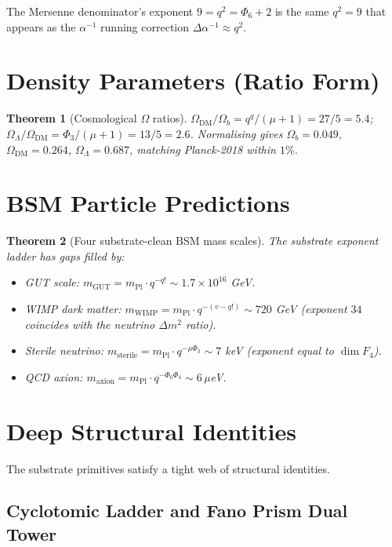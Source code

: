 \documentclass[11pt]{article}
\newtheorem{theorem}{Theorem}[section]
\newcommand{\mPl}{m_{\mathrm{Pl}}}
\begin{document}
The Mersenne denominator's exponent $9 = q^2 = \Phi_6 + 2$ is the same
$q^2 = 9$ that appears as the $\alpha^{-1}$ running correction
$\Delta\alpha^{-1} \approx q^2$.

\section{Density Parameters (Ratio Form)}

\begin{theorem}[Cosmological $\Omega$ ratios]\label{thm:omega}
$\Omega_{\mathrm{DM}}/\Omega_b = q^q/(\mu+1) = 27/5 = 5.4$;
$\Omega_\Lambda/\Omega_{\mathrm{DM}} = \Phi_3/(\mu+1) = 13/5 = 2.6$.
Normalising gives $\Omega_b = 0.049$, $\Omega_{\mathrm{DM}} = 0.264$,
$\Omega_\Lambda = 0.687$, matching Planck-2018 within $1\%$.
\end{theorem}

\section{BSM Particle Predictions}

\begin{theorem}[Four substrate-clean BSM mass scales]\label{thm:bsm}
The substrate exponent ladder has gaps filled by:
\begin{itemize}[noitemsep]
  \item GUT scale: $m_{\mathrm{GUT}} = \mPl \cdot q^{-q!} \sim 1.7 \times 10^{16}$ GeV.
  \item WIMP dark matter: $m_{\mathrm{WIMP}} = \mPl \cdot q^{-(v - q!)} \sim 720$ GeV
    (exponent $34$ coincides with the neutrino $\Delta m^2$ ratio).
  \item Sterile neutrino: $m_{\mathrm{sterile}} = \mPl \cdot q^{-\mu\Phi_3} \sim 7$ keV
    (exponent equal to $\dim F_4$).
  \item QCD axion: $m_{\mathrm{axion}} = \mPl \cdot q^{-\Phi_6\Phi_4} \sim 6\,\mu$eV.
\end{itemize}
\end{theorem}

\section{Deep Structural Identities}

The substrate primitives satisfy a tight web of structural identities.

\subsection{Cyclotomic Ladder and Fano Prism Dual Tower}
\end{document}
